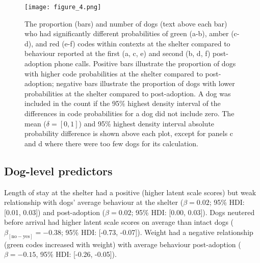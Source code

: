 \documentclass[12pt]{article}
\begin{document}
\begin{figure}[t!]
  \centering
  \texttt{[image: figure\_4.png]}
  \caption{The proportion (bars) and number of dogs (text above each bar) who had significantly different probabilities of green (a-b), amber (c-d), and red (e-f) codes within contexts at the shelter compared to behaviour reported at the first (a, c, e) and second (b, d, f) post-adoption phone calls. Positive bars illustrate the proportion of dogs with higher code probabilities at the shelter compared to post-adoption; negative bars illustrate the proportion of dogs with lower probabilities at the shelter compared to post-adoption. A dog was included in the count if the 95\% highest density interval of the differences in code probabilities for a dog did not include zero. The mean ($\delta = [0,1]$) and 95\% highest density interval absolute probability difference is shown above each plot, except for panels c and d where there were too few dogs for its calculation.}
  \label{fig_num_dogs}
\end{figure}

\subsection{Dog-level predictors}
Length of stay at the shelter had a positive (higher latent scale scores) but weak relationship with dogs' average behaviour at the shelter ($\beta = 0.02$; 95\% HDI: [0.01, 0.03]) and post-adoption ($\beta = 0.02$; 95\% HDI: [0.00, 0.03]). Dogs neutered before arrival had higher latent scale scores on average than intact dogs ($\beta_{[\text{no}-\text{yes}]} = -0.38$; 95\% HDI: [-0.73, -0.07]). Weight had a negative relationship (green codes increased with weight) with average behaviour post-adoption ($\beta = -0.15$, 95\% HDI: [-0.26, -0.05]).
\end{document}
